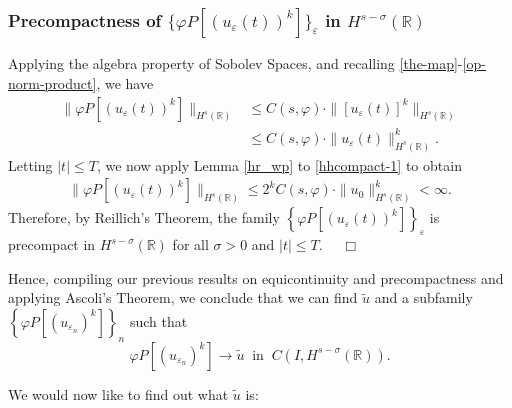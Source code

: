 \documentclass{beamer}
\newcommand{\rr}{\mathbb{R}}
\newcommand{\ee}{\varepsilon}
\newcommand{\vp}{\varphi}
\begin{document}
    \begin{frame}
      \frametitle{Precompactness of $\{\varphi P [(u_\ee(t))^k]\}_\ee$ in
		$H^{s-\sigma  }(\rr)$}
		Applying the algebra property of Sobolev
		Spaces, and recalling \eqref{the-map}-\eqref{op-norm-product}, we have
		\begin{equation}
			\begin{split}
			\label{hhcompact-1}
			 \|\varphi P [(u_\ee(t))^k]\|_{H^{s}(\rr)}
			& \le  C(s, \vp) \cdot \|[u_\ee(t)]^k\|_{H^{s}(\rr)}
			\\
			& \le C(s, \vp) \cdot \|u_\ee(t)\|^k_{H^{s}(\rr)}.
			\end{split}
		\end{equation}
		Letting $|t| \le T$, we now apply Lemma \ref{hr_wp} to
		\eqref{hhcompact-1} to obtain
		\begin{equation*}
			\begin{split}
			\|\varphi P [(u_\ee(t))^k]\|_{H^{s}(\rr)}
			\le 2^k C(s, \vp) \cdot  \|u_0 \|^k_{H^s(\rr)} < \infty.
			\end{split}
		\end{equation*}
		Therefore, by Reillich's Theorem, the family $\left\{
		\varphi P [(u_\ee(t))^k] \right\}_\ee$ is
		precompact in $H^{s- \sigma }(\rr)$ for all $\sigma > 0$ and $|t| \le T$. $\quad
		\Box$ 
		\vskip0.1in
  \end{frame}
  \begin{frame}
		Hence, compiling our previous results on equicontinuity and precompactness
		and applying Ascoli's Theorem, we
		conclude that we can find $\tilde{u}$ and a subfamily 
		\\ $\left\{
		\varphi P [(u_{\ee_n})^k]
		\right\}_n$ such that
		\begin{equation}
			\label{hhstrong-conv-of-u_ep}
			\varphi P [(u_{\ee_n})^k] \to \tilde{u}
			\; \; \text{in} \; \; C(I, H^{s-\sigma}(\rr)).
		\end{equation}
		
		\vskip0.1in
		We would now like to find out what $\tilde{u}$ is:
  \end{frame}
\end{document}
